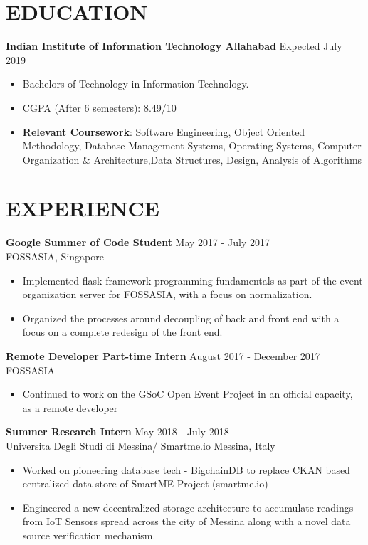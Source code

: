 \documentclass[margin, 7pt]{res} %
\begin{document}
\begin{resume}
\section{EDUCATION}  

\textbf{Indian Institute of Information Technology Allahabad} \hfill Expected July 2019
\begin{itemize}
\item Bachelors of Technology in Information Technology. 
\item CGPA (After 6 semesters): 8.49/10
\item \textbf{Relevant Coursework}: Software Engineering, Object Oriented Methodology, Database Management Systems, Operating Systems, Computer Organization & Architecture,Data Structures, Design, Analysis of Algorithms
\end{itemize} 

\section{EXPERIENCE}

\textbf{Google Summer of Code Student} \hfill May 2017 - July 2017 \\
FOSSASIA, Singapore
\begin{itemize}
\item Implemented flask framework programming fundamentals as part of the event organization server for FOSSASIA, with a focus on normalization.
\item Organized the processes around decoupling of back and front end with a focus on a complete redesign of the front end.
\end{itemize} 

\textbf{Remote Developer Part-time Intern} \hfill August 2017 - December 2017 \\
FOSSASIA
\begin{itemize}
\item Continued to work on the GSoC Open Event Project in an official capacity, as a remote developer
\end{itemize}

\textbf{Summer Research Intern} \hfill May 2018 - July 2018 \\
Universita Degli Studi di Messina/ Smartme.io Messina, Italy
\begin{itemize}
\item Worked on pioneering database tech - BigchainDB to replace CKAN based centralized data store of SmartME Project (smartme.io)
\item  Engineered a new decentralized storage architecture to accumulate readings from IoT Sensors spread across the city of Messina along with a novel data source verification mechanism.
\end{itemize} 


\end{resume}
\end{document}
